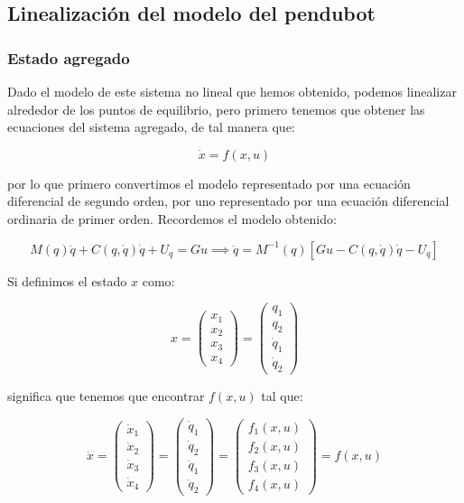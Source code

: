 \documentclass{article}
\begin{document}
    \subsection*{Linealización del modelo del
pendubot}\label{linealizaciuxf3n-del-modelo-del-pendubot}

    \subsubsection*{Estado agregado}\label{estado-agregado}

    Dado el modelo de este sistema no lineal que hemos obtenido, podemos
linealizar alrededor de los puntos de equilibrio, pero primero tenemos
que obtener las ecuaciones del sistema agregado, de tal manera que:

\[
\dot{x} = f(x, u)
\]

por lo que primero convertimos el modelo representado por una ecuación
diferencial de segundo orden, por uno representado por una ecuación
diferencial ordinaria de primer orden. Recordemos el modelo obtenido:

\[
M(q) \ddot{q} + C(q, \dot{q}) \dot{q} + U_q = G u \implies \ddot{q} = M^{-1}(q) \left[ G u - C(q, \dot{q}) \dot{q} - U_q \right]
\]

Si definimos el estado \(x\) como:

\[
x =
\begin{pmatrix}
x_1 \\
x_2 \\
x_3 \\
x_4
\end{pmatrix} =
\begin{pmatrix}
q_1 \\
q_2 \\
\dot{q}_1 \\
\dot{q}_2
\end{pmatrix}
\]

significa que tenemos que encontrar \(f(x, u)\) tal que:

\[
\dot{x} =
\begin{pmatrix}
\dot{x}_1 \\
\dot{x}_2 \\
\dot{x}_3 \\
\dot{x}_4
\end{pmatrix} =
\begin{pmatrix}
\dot{q}_1 \\
\dot{q}_2 \\
\ddot{q}_1 \\
\ddot{q}_2
\end{pmatrix} =
\begin{pmatrix}
f_1(x, u) \\
f_2(x, u) \\
f_3(x, u) \\
f_4(x, u)
\end{pmatrix} = f(x, u)
\]
\end{document}
